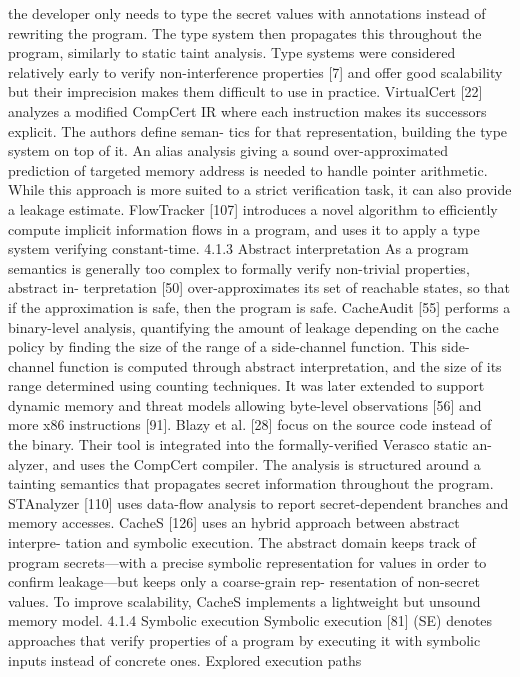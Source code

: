 the developer only needs to type the secret values with annotations
instead of rewriting the program. The type system then propagates
this throughout the program, similarly to static taint analysis. Type
systems were considered relatively early to verify non-interference
properties [7] and offer good scalability but their imprecision makes
them difficult to use in practice.
VirtualCert [22] analyzes a modified CompCert IR where each
instruction makes its successors explicit. The authors define seman-
tics for that representation, building the type system on top of it.
An alias analysis giving a sound over-approximated prediction of
targeted memory address is needed to handle pointer arithmetic.
While this approach is more suited to a strict verification task, it
can also provide a leakage estimate.
FlowTracker [107] introduces a novel algorithm to efficiently
compute implicit information flows in a program, and uses it to
apply a type system verifying constant-time.
4.1.3 Abstract interpretation As a program semantics is generally
too complex to formally verify non-trivial properties, abstract in-
terpretation [50] over-approximates its set of reachable states, so
that if the approximation is safe, then the program is safe.
CacheAudit [55] performs a binary-level analysis, quantifying
the amount of leakage depending on the cache policy by finding
the size of the range of a side-channel function. This side-channel
function is computed through abstract interpretation, and the size
of its range determined using counting techniques. It was later
extended to support dynamic memory and threat models allowing
byte-level observations [56] and more x86 instructions [91].
Blazy et al. [28] focus on the source code instead of the binary.
Their tool is integrated into the formally-verified Verasco static an-
alyzer, and uses the CompCert compiler. The analysis is structured
around a tainting semantics that propagates secret information
throughout the program.
STAnalyzer [110] uses data-flow analysis to report secret-dependent
branches and memory accesses.
CacheS [126] uses an hybrid approach between abstract interpre-
tation and symbolic execution. The abstract domain keeps track of
program secrets—with a precise symbolic representation for values
in order to confirm leakage—but keeps only a coarse-grain rep-
resentation of non-secret values. To improve scalability, CacheS
implements a lightweight but unsound memory model.
4.1.4 Symbolic execution Symbolic execution [81] (SE) denotes
approaches that verify properties of a program by executing it with
symbolic inputs instead of concrete ones. Explored execution paths
